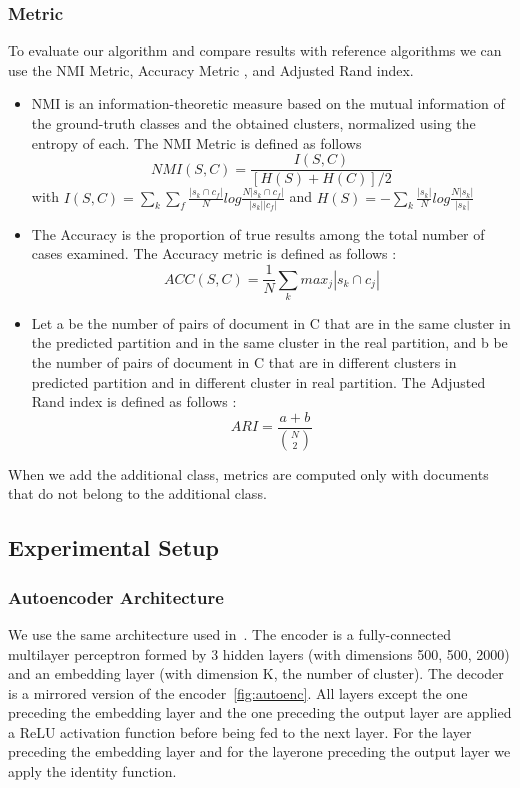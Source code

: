 \subsubsection{Metric}
To evaluate our algorithm and compare results with reference algorithms we can
use the NMI Metric, Accuracy Metric \cite{NMI_ACC}, and Adjusted
Rand index\cite{ARI}. 
\begin{itemize}
\item NMI is an information-theoretic measure based on the mutual information of the ground-truth classes
and the obtained clusters, normalized using the entropy of each. The NMI Metric is defined as follows
$$NMI(S,C) = \frac{I(S,C)}{[H(S)+H(C)]/2}$$ 
with
$I(S,C) =\sum\limits_k \sum\limits_f\frac{|s_k \cap c_f|}{N}log\frac{N|s_k \cap c_f|}{|s_k| |c_f|}$
and
$H(S) = -\sum\limits_k\frac{|s_k|}{N}log\frac{N|s_k|}{|s_k|}$
\item The Accuracy is the proportion of true results among the total
  number of cases examined. The Accuracy metric is defined as follows :
$$
ACC(S,C) = \frac{1}{N}\sum\limits_k {max}_j|s_k \cap c_j|
$$
\item Let a be the number of pairs of document in C
  that are in the same cluster in the predicted partition and in the
  same cluster in the real partition, and b be the number of pairs of
  document in C that are in different clusters in predicted partition
  and in different cluster in real partition.
  The Adjusted Rand index is defined as follows :
  $$ARI = \frac{a+b}{\binom{N}{2}}$$
\end{itemize}
When we add the additional class, metrics are computed only with
documents that do not belong to the additional class.
\subsection{Experimental Setup}
\subsubsection{Autoencoder Architecture}
We use the same architecture used in~\cite{Deap-K-Means}. The encoder is a fully-connected 
multilayer perceptron formed by 3 hidden layers (with dimensions 500, 500, 2000) 
and an embedding layer (with dimension K, the number of cluster). 
The decoder is a mirrored version of the encoder~\ref{fig:autoenc}.
All layers except the one preceding the embedding layer and the one
preceding the output layer are applied a ReLU activation function \cite{Nair:2010:RLU:3104322.3104425} 
before being fed to the next
layer. For the layer preceding the embedding layer and for the layerone preceding the output layer
we apply the identity function.
